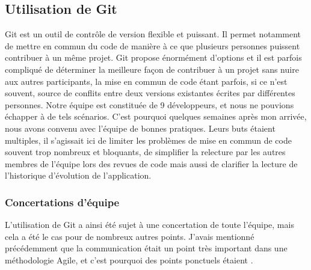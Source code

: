 \subsection{Utilisation de Git}
\label{sub:utilisation de Git}
Git est un outil de contrôle de version flexible et puissant.
Il permet notamment de mettre en commun du code de manière à ce que plusieurs personnes puissent contribuer à un même projet.
Git propose énormément d'options et il est parfois compliqué de déterminer la meilleure façon de contribuer à un projet sans nuire aux autres participants, la mise en commun de code étant parfois, si ce n'est souvent, source de conflits entre deux versions existantes écrites par différentes personnes.
Notre équipe est constituée de 9 développeurs, et nous ne pouvions échapper à de tels scénarios.
C'est pourquoi quelques semaines après mon arrivée, nous avons convenu avec l'équipe de bonnes pratiques.
Leurs buts étaient multiples, il s'agissait ici de limiter les problèmes de mise en commun de code souvent trop nombreux et bloquants, de simplifier la relecture par les autres membres de l'équipe lors des revues de code mais aussi de clarifier la lecture de l'historique d'évolution de l'application.

\subsubsection{Concertations d'équipe}
\label{subs:Concertations d'équipe}
L'utilisation de Git a ainsi été sujet à une concertation de toute l'équipe, mais cela a été le cas pour de nombreux autres points.
J'avais mentionné précédemment que la communication était un point très important dans une méthodologie Agile, et c'est pourquoi des points ponctuels étaient .

